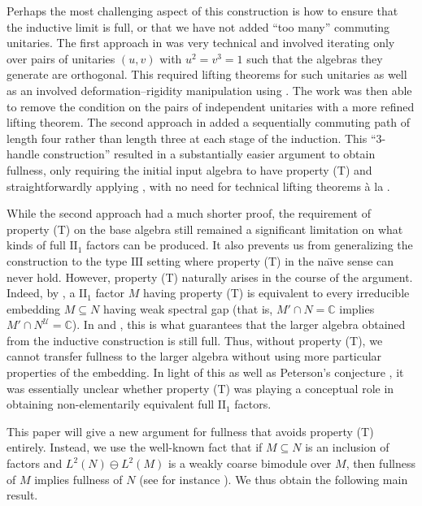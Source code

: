 \documentclass[10pt]{amsart}
\numberwithin{equation}{section}
\theoremstyle{definition}
\newcommand{\C}{\mathbb{C}}
\begin{document}
Perhaps the most challenging aspect of this construction is how to ensure that the inductive limit is full, or that we have not added ``too many'' commuting unitaries.  The first approach in \cite{CIKE23} was very technical and involved iterating only over pairs of unitaries $(u,v)$ with $u^2 = v^3 = 1$ such that the algebras they generate are orthogonal.  This required lifting theorems for such unitaries as well as an involved deformation--rigidity manipulation using \cite{IPP}. The work \cite{houdayer2023asymptotic} was then able to remove the condition on the pairs of independent unitaries with a more refined lifting theorem. The second approach in \cite{gao20253handleconstructionii1factors} added a sequentially commuting path of length four rather than length three at each stage of the induction.  This ``$3$-handle construction'' resulted in a substantially easier argument to obtain fullness, only requiring the initial input algebra to have property (T) and straightforwardly applying \cite{IPP}, with no need for technical lifting theorems \`a la \cite{CIKE23,houdayer2023asymptotic}.

While the second approach had a much shorter proof, the requirement of property (T) on the base algebra still remained a significant limitation on what kinds of full $\mathrm{II}_1$ factors can be produced.  It also prevents us from generalizing the construction to the type $\mathrm{III}$ setting where property (T) in the na{\"\i}ve sense can never hold.  However, property (T) naturally arises in the course of the argument.   Indeed, by \cite{tan2023spectral}, a $\mathrm{II}_1$ factor $M$ having property (T) is equivalent to every irreducible embedding $M \subseteq N$ having weak spectral gap (that is, $M' \cap N = \C$ implies $M' \cap N^{\mathcal{U}} = \C$).  In \cite{CIKE23} and \cite{gao20253handleconstructionii1factors}, this is what guarantees that the larger algebra obtained from the inductive construction is still full.  Thus, without property (T), we cannot transfer fullness to the larger algebra without using more particular properties of the embedding.  In light of this as well as Peterson's conjecture \cite[Problem U5]{JessePL}, it was essentially unclear whether property (T) was playing a conceptual role in obtaining non-elementarily equivalent full $\mathrm{II}_1$ factors.

This paper will give a new argument for fullness that avoids property (T) entirely.  Instead, we use the well-known fact that if $M \subseteq N$ is an inclusion of factors and $L^2(N) \ominus L^2(M)$ is a weakly coarse bimodule over $M$, then fullness of $M$ implies fullness of $N$ (see for instance \cite{ioana2023existential}).  We thus obtain the following main result.
\end{document}
